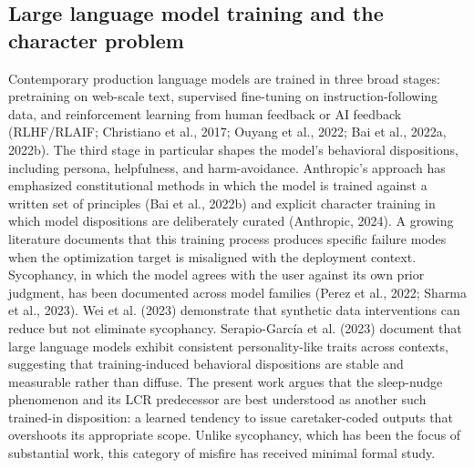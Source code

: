 \documentclass{obelus-preprint}
\begin{document}
\subsection{Large language model training and the character problem}
Contemporary production language models are trained in three broad stages: pretraining on web-scale text, supervised fine-tuning on instruction-following data, and reinforcement learning from human feedback or AI feedback (RLHF/RLAIF; Christiano et al., 2017; Ouyang et al., 2022; Bai et al., 2022a, 2022b). The third stage in particular shapes the model's behavioral dispositions, including persona, helpfulness, and harm-avoidance. Anthropic's approach has emphasized constitutional methods in which the model is trained against a written set of principles (Bai et al., 2022b) and explicit character training in which model dispositions are deliberately curated (Anthropic, 2024).
A growing literature documents that this training process produces specific failure modes when the optimization target is misaligned with the deployment context. Sycophancy, in which the model agrees with the user against its own prior judgment, has been documented across model families (Perez et al., 2022; Sharma et al., 2023). Wei et al. (2023) demonstrate that synthetic data interventions can reduce but not eliminate sycophancy. Serapio-García et al. (2023) document that large language models exhibit consistent personality-like traits across contexts, suggesting that training-induced behavioral dispositions are stable and measurable rather than diffuse.
The present work argues that the sleep-nudge phenomenon and its LCR predecessor are best understood as another such trained-in disposition: a learned tendency to issue caretaker-coded outputs that overshoots its appropriate scope. Unlike sycophancy, which has been the focus of substantial work, this category of misfire has received minimal formal study.
\end{document}
